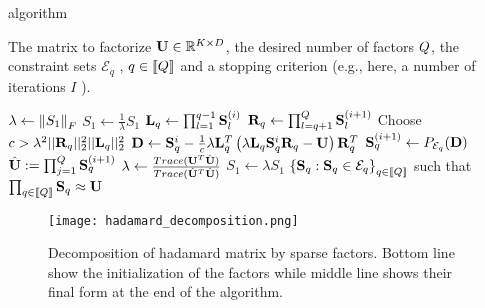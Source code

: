 \begin{algorithm}
	\caption{\palm algorithm}
	\label{algo:palm4msa}
	\begin{algorithmic}[1]
		
		\REQUIRE The matrix to factorize ${\mathbf{U}} \in \mathbb{R}^{K \times D}$, the desired number of factors $Q$, the constraint sets $\mathcal{E}_q$ , $q\in \left \llbracket Q\right \rrbracket$ and a stopping criterion (e.g., here, a number of iterations $I$ ).
		
		\STATE $\lambda \leftarrow \left \| S_1\right \|_F$
		\label{line:palm:init:lambda}
		\STATE $S_1 \leftarrow \frac{1}{\lambda} S_1$
		\label{line:palm:normalize:S1}
		\STATE  ${\mathbf{L}}_q \leftarrow \prod_{l=1}^{q-1} {\mathbf{S}}_{l}^{(i)}$
		\label{line:palm:L}
		\STATE  ${\mathbf{R}}_q \leftarrow \prod_{l=q+1}^{Q} {\mathbf{S}}_{l}^{(i+1)}$
		\label{line:palm:R}
		\STATE Choose $c > \lambda^2 ||{\mathbf{R}}_q||_2^2 ||{\mathbf{L}}_q||_2^2$
		\label{line:palm:c}
		\STATE ${\mathbf{D}} \leftarrow {\mathbf{S}}_q^i - \frac{1}{c} \lambda {\mathbf{L}}_q^T\left (\lambda{\mathbf{L}}_q {\mathbf{S}}_q^i {\mathbf{R}}_q - {\mathbf{U}}\right ){\mathbf{R}}_q^T$
		\label{line:palm:D}
		\STATE ${\mathbf{S}}^{(i+1)}_q \leftarrow P_{\mathcal{E}_q}({\mathbf{D}})$
		\label{line:palm:update:S}
		\ENDFOR
		\STATE $\hat {{\mathbf{U}}} := \prod_{j=1}^{Q} {\mathbf{S}}_q^{(i+1)}$
		\label{line:palm:U}
		\STATE $\lambda \leftarrow \frac{Trace({\mathbf{U}}^T\hat{{\mathbf{U}}})}{Trace(\hat{{\mathbf{U}}}^T\hat{{\mathbf{U}}})}$
		\label{line:palm:update:lambda}
		\ENDFOR
		\STATE $S_1 \leftarrow \lambda S_1$
		\label{line:palm:postprocess:S1}
		\ENSURE $\left \lbrace {\mathbf{S}}_q : {\mathbf{S}}_q \in \mathcal{E}_q\right \rbrace_{q\in\left \llbracket Q\right \rrbracket}$ such that $\prod_{q\in\left \llbracket Q\right \rrbracket}{\mathbf{S}}_q \approx {\mathbf{U}}$
		
	\end{algorithmic}
\end{algorithm}

\begin{figure}
\centering
 \texttt{[image: hadamard\_decomposition.png]}
 \caption{Decomposition of hadamard matrix by sparse factors. Bottom line show the initialization of the factors while middle line shows their final form at the end of the algorithm.}
\end{figure}


